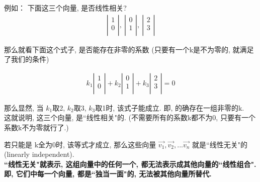 \documentclass[UTF8]{ctexart}
\begin{document}
\begin{myEnvSample}
	例如： 下面这三个向量, 是否线性相关?
	\begin{align}
		\left| \begin{array}{l}
			1 \\
			0 \\
		\end{array} \right|,\ \left| \begin{array}{l}
			0 \\
			1 \\
		\end{array} \right|,\ \left| \begin{array}{l}
			2 \\
			3 \\
		\end{array} \right|
	\end{align}
	
	那么就看下面这个式子, 是否能存在非零的系数 (只要有一个k是不为零的, 就满足了我们的条件)
	
	\begin{align}
		k_1\left| \begin{array}{l}
			1 \\
			0 \\
		\end{array} \right|+k_2\left| \begin{array}{l}
			0 \\
			1 \\
		\end{array} \right|+k_3\left| \begin{array}{l}
			2 \\
			3 \\
		\end{array} \right|=0
	\end{align}
	
	那么显然, 当 $ k_1$取2, $k_2$取3, $k_3$取1时, 该式子能成立. 即, 的确存在一组非零的k. \\
	这就说明, 这三个向量, 是``线性相关"的. (不需要所有的系数k都不为0, 只要有一个系数k不为零就行了.)
\end{myEnvSample}


若只能是 k全为0时, 该等式才成立, 那么这些向量 $ \vec{v_1},  \vec{v_2}, ...  \vec{v_n}$ 就是``线性无关"的 (linearly independent). \\

\textbf{``线性无关"就表示, 这组向量中的任何一个, 都无法表示成其他向量的``线性组合". 即, 它们中每一个向量, 都是``独当一面"的, 无法被其他向量所替代.}
\end{document}
